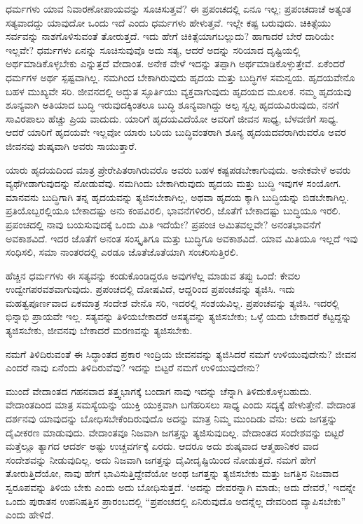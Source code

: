 ಧರ್ಮಗಳು ಯಾವ ನಿವಾರಣೋಪಾಯವನ್ನು ಸೂಚಿಸುತ್ತವೆ? ಈ ಪ್ರಪಂಚದಲ್ಲಿ ಏನೂ ಇಲ್ಲ; ಪ್ರಪಂಚದಾಚೆ ಅತ್ಯಂತ ಸತ್ಯವಾದದ್ದು ಯಾವುದೋ ಒಂದು ಇದೆ ಎಂದು ಧರ್ಮಗಳು ಹೇಳುತ್ತವೆ. ಇಲ್ಲೇ ಕಷ್ಟ ಬರುವುದು. ಚಿಕಿತ್ಸೆಯು ಸರ್ವವನ್ನು ನಾಶಗೊಳಿಸುವಂತೆ ತೋರುತ್ತದೆ. ಇದು ಹೇಗೆ ಚಿಕಿತ್ಸೆಯಾಗಬಲ್ಲುದು? ಹಾಗಾದರೆ ಬೇರೆ ದಾರಿಯೇ ಇಲ್ಲವೇ? ಧರ್ಮಗಳು ಏನನ್ನು ಸೂಚಿಸುವುವೊ ಅದು ಸತ್ಯ, ಆದರೆ ಅದನ್ನು ಸರಿಯಾದ ದೃಷ್ಟಿಯಲ್ಲಿ ಅರ್ಥಮಾಡಿಕೊಳ್ಳಬೇಕು ಎನ್ನುತ್ತದೆ ವೇದಾಂತ. ಅನೇಕ ವೇಳೆ ಇದನ್ನು ತಪ್ಪಾಗಿ ಅರ್ಥಮಾಡಿಕೊಳ್ಳುತ್ತೇವೆ. ಏಕೆಂದರೆ ಧರ್ಮಗಳ ಅರ್ಥ ಸ್ಪಷ್ಟವಾಗಿಲ್ಲ. ನಮಗಿಂದ ಬೇಕಾಗಿರುವುದು ಹೃದಯ ಮತ್ತು ಬುದ್ಧಿಗಳ ಸಮನ್ವಯ. ಹೃದಯವೇನೊ ಬಹಳ ಮುಖ್ಯವೇ ಸರಿ. ಜೀವನದಲ್ಲಿ ಅದ್ಭುತ ಸ್ಫೂರ್ತಿಯು ವ್ಯಕ್ತವಾಗುವುದು ಹೃದಯದ ಮೂಲಕ. ನಮ್ಮ ಹೃದಯವು ಶೂನ್ಯವಾಗಿ ಅತಿಯಾದ ಬುದ್ಧಿ ಇರುವುದಕ್ಕಿಂತಲೂ ಬುದ್ಧಿ ಶೂನ್ಯವಾಗಿದ್ದು ಅಲ್ಪ ಸ್ವಲ್ಪ ಹೃದಯವಿರುವುದು, ನನಗೆ ಸಾವಿರಪಾಲು ಹೆಚ್ಚು ಪ್ರಿಯ ವಾದುದು. ಯಾರಿಗೆ ಹೃದಯವಿದೆಯೋ ಅವರಿಗೆ ಜೀವನ ಸಾಧ್ಯ, ಬೆಳವಣಿಗೆ ಸಾಧ್ಯ. ಆದರೆ ಯಾರಿಗೆ ಹೃದಯವೇ ಇಲ್ಲವೋ ಯಾರು ಬರಿಯ ಬುದ್ಧಿವಂತರಾಗಿ ಶೂನ್ಯ ಹೃದಯದವರಾಗಿರುವರೊ ಅವರ ಜೀವನವು ಶುಷ್ಕವಾಗಿ ಅವರು ಸಾಯುತ್ತಾರೆ.

ಯಾರು ಹೃದಯದಿಂದ ಮಾತ್ರ ಪ್ರೇರೇಪಿತರಾಗಿರುವರೊ ಅವರು ಬಹಳ ಕಷ್ಟಪಡಬೇಕಾಗುವುದು. ಅನೇಕವೇಳೆ ಅವರು ವ್ಯಥೆಗೀಡಾಗುವುದನ್ನು ನೋಡುವೆವು. ನಮಗಿಂದು ಬೇಕಾಗಿರುವುದು ಹೃದಯ ಮತ್ತು ಬುದ್ಧಿ ಇವುಗಳ ಸಂಯೋಗ. ಮಾನವನು ಬುದ್ಧಿಗಾಗಿ ತನ್ನ ಹೃದಯವನ್ನು ತ್ಯಜಿಸಬೇಕಾಗಿಲ್ಲ, ಅಥವಾ ಹೃದಯ ಕ್ಕಾಗಿ ಬುದ್ಧಿಯನ್ನು ಬಿಡಬೇಕಾಗಿಲ್ಲ. ಪ್ರತಿಯೊಬ್ಬರಲ್ಲಿಯೂ ಬೇಕಾದಷ್ಟು ಅನು ಕಂಪವಿರಲಿ, ಭಾವನೆಗಳಿರಲಿ, ಜೊತೆಗೆ ಬೇಕಾದಷ್ಟು ಬುದ್ಧಿಯೂ ಇರಲಿ. ಪ್ರಪಂಚದಲ್ಲಿ ನಾವು ಬಯಸುವುದಕ್ಕೆ ಒಂದು ಮಿತಿ ಇದೆಯೇ? ಪ್ರಪಂಚ ಅಮಿತವಲ್ಲವೇ? ಅನಂತಭಾವನೆಗೆ ಅವಕಾಶವಿದೆ. ಇದರ ಜೊತೆಗೆ ಅನಂತ ಸಂಸ್ಕೃತಿಗೂ ಮತ್ತು ಬುದ್ಧಿಗೂ ಅವಕಾಶವಿದೆ. ಯಾವ ಮಿತಿಯೂ ಇಲ್ಲದೆ ಇವು ಸಂಧಿಸಲಿ, ಸಮಾ ನಾಂತರದಲ್ಲಿ ಎರಡೂ ಜೊತೆಜೊತೆಯಾಗಿ ಸಂಚರಿಸುತ್ತಿರಲಿ.

ಹೆಚ್ಚಿನ ಧರ್ಮಗಳು ಈ ಸತ್ಯವನ್ನು ಕಂಡುಕೊಂಡಿದ್ದರೂ ಅವುಗಳೆಲ್ಲ ಮಾಡುವ ತಪ್ಪು ಒಂದೆ: ಕೇವಲ ಉದ್ವೇಗಪರವಶವಾಗುವುದು. ಪ್ರಪಂಚದಲ್ಲಿ ದೋಷವಿದೆ, ಆದ್ದರಿಂದ ಪ್ರಪಂಚವನ್ನು ತ್ಯಜಿಸಿ. ಇದು ಮಹತ್ವಪೂರ್ಣವಾದ ಏಕಮಾತ್ರ ಸಂದೇಶ ವೇನೊ ಸರಿ, ಇದರಲ್ಲಿ ಸಂಶಯವಿಲ್ಲ. ಪ್ರಪಂಚವನ್ನು ತ್ಯಜಿಸಿ. ಇದರಲ್ಲಿ ಭಿನ್ನಾಭಿ ಪ್ರಾಯವೇ ಇಲ್ಲ. ಸತ್ಯವನ್ನು ತಿಳಿಯಬೇಕಾದರೆ ಅಸತ್ಯವನ್ನು ತ್ಯಜಿಸಬೇಕು; ಒಳ್ಳೆ ಯದು ಬೇಕಾದರೆ ಕೆಟ್ಟದ್ದನ್ನು ತ್ಯಜಿಸಬೇಕು, ಜೀವನವು ಬೇಕಾದರೆ ಮರಣವನ್ನು ತ್ಯಜಿಸಬೇಕು.

ನಮಗೆ ತಿಳಿದಿರುವಂತೆ ಈ ಸಿದ್ಧಾಂತದ ಪ್ರಕಾರ ಇಂದ್ರಿಯ ಜೀವನವನ್ನು ತ್ಯಜಿಸಿದರೆ ನಮಗೆ ಉಳಿಯುವುದೇನು? ಜೀವನ ಎಂದರೆ ನಾವು ಏನೆಂದು ತಿಳಿದಿರುವೆವು? ಇದನ್ನು ಬಿಟ್ಟರೆ ನಮಗೆ ಉಳಿಯುವುದೇನು?

ಮುಂದೆ ವೇದಾಂತದ ಗಹನವಾದ ತತ್ತ್ವಭಾಗಕ್ಕೆ ಬಂದಾಗ ನಾವು ಇದನ್ನು ಚೆನ್ನಾಗಿ ತಿಳಿದುಕೊಳ್ಳಬಹುದು. ವೇದಾಂತದಿಂದ ಮಾತ್ರ ಸಮಸ್ಯೆಯನ್ನು ಯುಕ್ತಿ ಯುಕ್ತವಾಗಿ ಬಗೆಹರಿಸಲು ಸಾಧ್ಯ ಎಂದು ಸದ್ಯಕ್ಕೆ ಹೇಳುತ್ತೇನೆ. ವೇದಾಂತ ದರ್ಶನವು ಯಾವುದನ್ನು ಬೋಧಿಸಬೇಕೆಂದಿರುವುದೊ ಅದನ್ನು ಮಾತ್ರ ನಿಮ್ಮ ಮುಂದಿಡು ವೆನು: ಅದು ಜಗತ್ತನ್ನು ದೈವೀಕರಣ ಮಾಡುವುದು. ವೇದಾಂತವೂ ನಿಜವಾಗಿ ಜಗತ್ತನ್ನು ತ್ಯಜಿಸುವುದಿಲ್ಲ. ವೇದಾಂತದ ಸಂದೇಶವನ್ನು ಬಿಟ್ಟರೆ ಮತ್ತೆಲ್ಲೂ ತ್ಯಾಗದ ಆದರ್ಶ ಅಷ್ಟು ಉಚ್ಚವರ್ಗಕ್ಕೆ ಏರದು. ಆದರೂ ಅದು ಶುಷ್ಕವಾದ ಆತ್ಮಹಾನಿಕರ ವಾದ ಸಂದೇಶವನ್ನು ನೀಡುವುದಿಲ್ಲ. ಅದು ನಿಜವಾಗಿ ಜಗತ್ತನ್ನು ದೈವೀದೃಷ್ಟಿಯಿಂದ ನೋಡುತ್ತದೆ. ನಮಗೆ ಹೇಗೆ ತೋರುತ್ತಿದೆಯೋ, ನಾವು ಹೇಗೆ ಭಾವಿಸುತ್ತಿದ್ದೇವೆಯೋ ಅಂಥ ಜಗತ್ತನ್ನು ತ್ಯಜಿಸಬೇಕು ಮತ್ತು ಜಗತ್ತಿನ ನಿಜವಾದ ಸ್ವರೂಪವನ್ನು ತಿಳಿಯ ಬೇಕು ಎಂದು ಅದು ಬೋಧಿಸುತ್ತದೆ. ‘ಅದನ್ನು ದೇವರನ್ನಾಗಿ ಮಾಡು; ಅದು ದೇವರೆ,’ ಇದನ್ನೇ ಒಂದು ಪುರಾತನ ಉಪನಿಷತ್ತಿನ ಪ್ರಾರಂಬದಲ್ಲಿ “ಪ್ರಪಂಚದಲ್ಲಿ ಏನಿರುವುದೊ ಅದನ್ನೆಲ್ಲ ದೇವರಿಂದ ವ್ಯಾಪಿಸಬೇಕು” ಎಂದು ಹೇಳಿದೆ.

